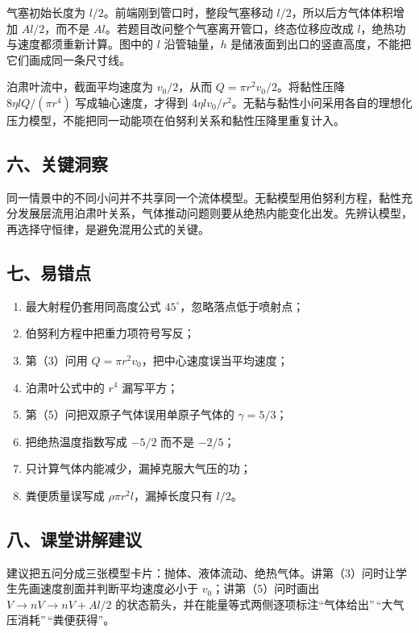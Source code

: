 \documentclass[12pt,a4paper,UTF8]{ctexart}
\newcommand{\tightlist}{\setlength{\itemsep}{0pt}\setlength{\parskip}{0pt}}
\begin{document}
气塞初始长度为 \(l/2\)。前端刚到管口时，整段气塞移动
\(l/2\)，所以后方气体体积增加 \(Al/2\)，而不是
\(Al\)。若题目改问整个气塞离开管口，终态位移应改成
\(l\)，绝热功与速度都须重新计算。图中的 \(l\) 沿管轴量，\(h\)
是储液面到出口的竖直高度，不能把它们画成同一条尺寸线。

泊肃叶流中，截面平均速度为 \(v_0/2\)，从而
\(Q=\pi r^2v_0/2\)。将黏性压降 \(8\eta lQ/(\pi r^4)\)
写成轴心速度，才得到
\(4\eta lv_0/r^2\)。无黏与黏性小问采用各自的理想化压力模型，不能把同一动能项在伯努利关系和黏性压降里重复计入。

\subsection{六、关键洞察}\label{ux516dux5173ux952eux6d1eux5bdf-4}

同一情景中的不同小问并不共享同一个流体模型。无黏模型用伯努利方程，黏性充分发展层流用泊肃叶关系，气体推动问题则要从绝热内能变化出发。先辨认模型，再选择守恒律，是避免混用公式的关键。

\subsection{七、易错点}\label{ux4e03ux6613ux9519ux70b9-4}

\begin{enumerate}
\def\labelenumi{\arabic{enumi}.}
\tightlist
\item
  最大射程仍套用同高度公式 \(45^\circ\)，忽略落点低于喷射点；
\item
  伯努利方程中把重力项符号写反；
\item
  第（3）问用 \(Q=\pi r^2v_0\)，把中心速度误当平均速度；
\item
  泊肃叶公式中的 \(r^4\) 漏写平方；
\item
  第（5）问把双原子气体误用单原子气体的 \(\gamma=5/3\)；
\item
  把绝热温度指数写成 \(-5/2\) 而不是 \(-2/5\)；
\item
  只计算气体内能减少，漏掉克服大气压的功；
\item
  粪便质量误写成 \(\rho\pi r^2l\)，漏掉长度只有 \(l/2\)。
\end{enumerate}

\subsection{八、课堂讲解建议}\label{ux516bux8bfeux5802ux8bb2ux89e3ux5efaux8bae-4}

建议把五问分成三张模型卡片：抛体、液体流动、绝热气体。讲第（3）问时让学生先画速度剖面并判断平均速度必小于
\(v_0\)；讲第（5）问时画出 \(V\to nV\to nV+Al/2\)
的状态箭头，并在能量等式两侧逐项标注``气体给出''\,``大气压消耗''\,``粪便获得''。
\end{document}
